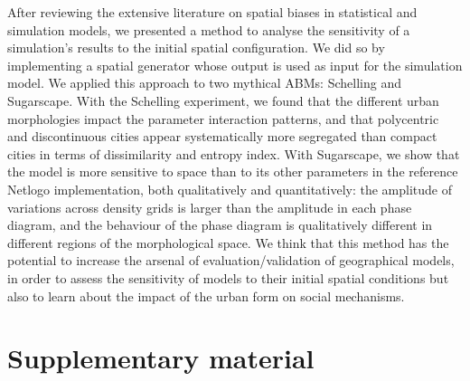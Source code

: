 \documentclass[3p,times,procedia]{elsarticle}
\begin{document}
After reviewing the extensive literature on spatial biases in statistical and simulation models, we presented a method to analyse the sensitivity of a simulation's results to the initial spatial configuration. We did so by implementing a spatial generator whose output is used as input for the simulation model. We applied this approach to two mythical ABMs: Schelling and Sugarscape. With the Schelling experiment, we found that the different urban morphologies impact the parameter interaction patterns, and that polycentric and discontinuous cities appear systematically more segregated than compact cities in terms of dissimilarity and entropy index. With Sugarscape, we show that the model is more sensitive to space than to its other parameters in the reference Netlogo implementation, both qualitatively and quantitatively: the amplitude of variations across density grids is larger than the amplitude in each phase diagram, and the behaviour of the phase diagram is qualitatively different in different regions of the morphological space. We think that this method has the potential to increase the arsenal of evaluation/validation of geographical models, in order to assess the sensitivity of models to their initial spatial conditions but also to learn about the impact of the urban form on social mechanisms.









\newpage

\section*{Supplementary material}
\end{document}
